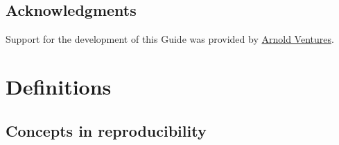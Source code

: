 \documentclass[]{book}
\begin{document}
\hypertarget{acknowledgments}{%
\section{Acknowledgments}\label{acknowledgments}}

Support for the development of this Guide was provided by \href{https://www.arnoldventures.org/}{Arnold Ventures}.

\hypertarget{definitions}{%
\chapter{Definitions}\label{definitions}}

\hypertarget{concepts-in-reproducibility}{%
\section{Concepts in reproducibility}\label{concepts-in-reproducibility}}
\end{document}
